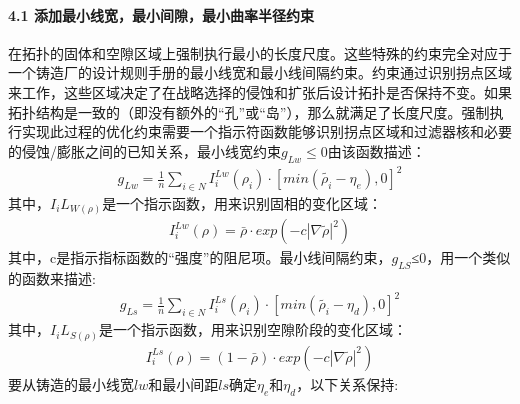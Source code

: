 \documentclass[letterpaper,10pt,english]{sphinxmanual}
\begin{document}
\paragraph{4.1 添加最小线宽，最小间隙，最小曲率半径约束}
\label{\detokenize{_u7b80_u4ecb/_u6838_u5fc3_u8bbe_u8ba1_u4f18_u5316_u7b97_u6cd5/_u68af_u5ea6_u62d3_u6251_u4f18_u5316_u6a21_u5757/_u68af_u5ea6_u62d3_u6251_u4f18_u5316_u7b97_u6cd5:id15}}
\sphinxAtStartPar
在拓扑的固体和空隙区域上强制执行最小的长度尺度。这些特殊的约束完全对应于一个铸造厂的设计规则手册的最小线宽和最小线间隔约束。约束通过识别拐点区域来工作，这些区域决定了在战略选择的侵蚀和扩张后设计拓扑是否保持不变。如果拓扑结构是一致的（即没有额外的“孔”或“岛”），那么就满足了长度尺度。强制执行实现此过程的优化约束需要一个指示符函数能够识别拐点区域和过滤器核和必要的侵蚀/膨胀之间的已知关系，最小线宽约束\(g_{Lw}≤0\)由该函数描述：
\begin{equation*}
\begin{split}g_{Lw}=\frac{1}{n}\sum_{i∈N} I_i^{Lw}(ρ_i)·[min{(\tilde{\rho_i}-η_e),0}]^2\end{split}
\end{equation*}
\sphinxAtStartPar
其中，\(I_{i}L_{W(ρ)}\)是一个指示函数，用来识别固相的变化区域：
\begin{equation*}
\begin{split}I_i^{Lw}(\rho)=\bar{\rho}·exp(-c\left| \nabla{\tilde{\rho}} \right|^2)\end{split}
\end{equation*}
\sphinxAtStartPar
其中，c是指示指标函数的“强度”的阻尼项。最小线间隔约束，\(g_{LS}\)≤0，用一个类似的函数来描述:
\begin{equation*}
\begin{split}g_{Ls}=\frac{1}{n}\sum_{i∈N} I_i^{Ls}(ρ_i)·[min{(\tilde{\rho_i}-η_d),0}]^2\end{split}
\end{equation*}
\sphinxAtStartPar
其中，\(I_{i}L_{S(ρ)}\)是一个指示函数，用来识别空隙阶段的变化区域：
\begin{equation*}
\begin{split}I_i^{Ls}(\rho)=(1-\bar{\rho})·exp(-c\left| \nabla{\tilde{\rho}} \right|^2)\end{split}
\end{equation*}
\sphinxAtStartPar
要从铸造的最小线宽\(lw\)和最小间距\(ls\)确定\(η_{e}\)和\(η_{d}\)，以下关系保持:
\end{document}
